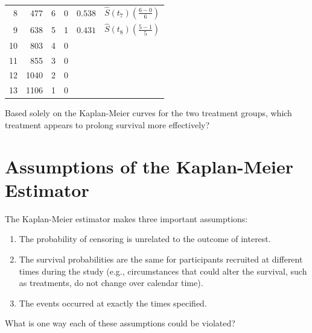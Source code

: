\begin{question}{}
{\begin{center}
\begin{tabular}{rrrrll}
  8 & 477 & 6 & 0 & $0.538$ & $\hat{S}(t_7) \left(\frac{6-0}{6}\right)$\\
  9 & 638 & 5 & 1 & $0.431$ & $\hat{S}(t_8) \left(\frac{5-1}{5}\right)$\\[2mm]
  10 & 803 & 4 & 0 & \\[2mm] %
  11 & 855 & 3 & 0 & \\[2mm] %
  12 & 1040 & 2 & 0 & \\[2mm] %
  13 & 1106 & 1 & 0 & \\[2mm] %
  \bottomrule
\end{tabular}
\end{center}
}
\end{question}

\begin{question}{}
Based solely on the Kaplan-Meier curves for the two treatment groups, which treatment appears to prolong survival more effectively?
\end{question}


\section{Assumptions of the Kaplan-Meier Estimator}

The Kaplan-Meier estimator makes three important assumptions:
\begin{enumerate}
\item The probability of censoring is unrelated to the outcome of interest.
\item The survival probabilities are the same for participants recruited at different times during the study (e.g., circumstances that could alter the survival, such as treatments, do not change over calendar time).
\item The events occurred at exactly the times specified. 
\end{enumerate}

\begin{question}{}
What is one way each of these assumptions could be violated?
\end{question}

